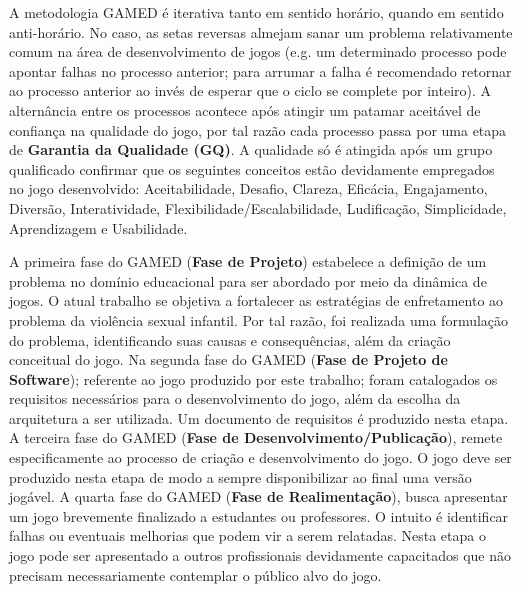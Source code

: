 A metodologia GAMED é iterativa tanto em sentido horário, quando em sentido anti-horário. No caso, as setas reversas almejam sanar um problema relativamente comum na área de desenvolvimento de jogos (e.g. um determinado processo pode apontar falhas no processo anterior; para arrumar a falha é recomendado retornar ao processo anterior ao invés de esperar que o ciclo se complete por inteiro). A alternância entre os processos acontece após atingir um patamar aceitável de confiança na qualidade do jogo, por tal razão cada processo passa por uma etapa de \textbf{Garantia da Qualidade (GQ)}. A qualidade só é atingida após um grupo qualificado confirmar que os seguintes conceitos estão devidamente empregados no jogo desenvolvido: Aceitabilidade, Desafio, Clareza, Eficácia, Engajamento, Diversão, Interatividade, Flexibilidade/Escalabilidade, Ludificação, Simplicidade, Aprendizagem e Usabilidade. 





\vspace{-0.2cm}

A primeira fase do GAMED (\textbf{Fase de Projeto}) estabelece a definição de um problema no domínio educacional para ser abordado por meio da dinâmica de jogos. O atual trabalho se objetiva a fortalecer as estratégias de enfretamento ao problema da violência sexual infantil. Por tal razão, foi realizada uma formulação do problema, identificando suas causas e consequências, além da criação conceitual do jogo. Na segunda fase do GAMED (\textbf{Fase de Projeto de Software}); referente ao jogo produzido por este trabalho; foram catalogados os requisitos necessários para o desenvolvimento do jogo, além da escolha da arquitetura a ser utilizada. Um documento de requisitos é produzido nesta etapa. A terceira fase do GAMED (\textbf{Fase de Desenvolvimento/Publicação}), remete especificamente ao processo de criação e desenvolvimento do jogo. O jogo deve ser produzido nesta etapa de modo a sempre disponibilizar ao final uma versão jogável. A quarta fase do GAMED (\textbf{Fase de Realimentação}), busca apresentar um jogo brevemente finalizado a estudantes ou professores. O intuito é identificar falhas ou eventuais melhorias que podem vir a serem relatadas. Nesta etapa o jogo pode ser apresentado a outros profissionais devidamente capacitados que não precisam necessariamente contemplar o público alvo do jogo.

